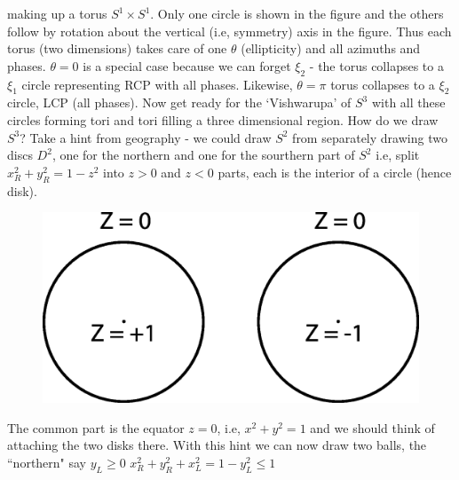 making up a torus $S^1 \times S^1$. Only one circle is shown in the figure and the others
follow by rotation about the vertical (i.e, symmetry) axis in the figure. Thus
each torus (two dimensions) takes care of one $\theta$ (ellipticity) and all azimuths
and phases. $\theta = 0$ is a special case because we can forget $\xi_2$ - the torus collapses
to a $\xi_1$ circle representing RCP with all phases. Likewise, $\theta = \pi$ torus collapses
to a $\xi_2$ circle, LCP (all phases). Now get ready for the `Vishwarupa' of $S^3$ with
all these circles forming tori and tori filling a three dimensional region. How do
we draw $S^3$? Take a hint from geography - we could draw $S^2$ from separately
drawing two discs $D^2$, one for the northern and one for the sourthern part of
$S^2$ i.e, split $x^2_R + y^2_R = 1 - z^2$ into $z > 0$ and $z < 0$ parts, each is the interior of
a circle (hence disk).
\begin{figure}[H]
\centering
\includegraphics[scale=0.13]{src/images/chap26/14.jpg}
\end{figure}

The common part is the equator $z = 0$, i.e, $x^2 + y^2 = 1$ and we should think
of attaching the two disks there. With this hint we can now draw two balls,
the ~ ``northern" say $y_{L}  \geq 0$  \quad $x^2_R + y^2_R + x^2_L = 1 - y^2_L \leq 1$

\smallskip

